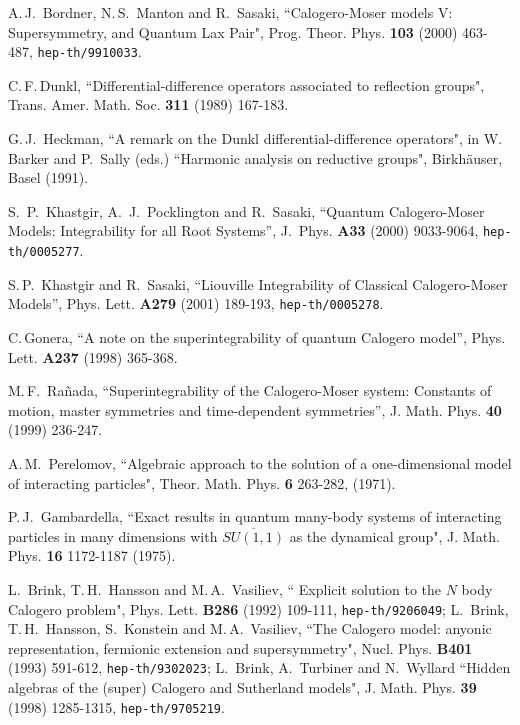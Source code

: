 \documentclass[a4paper,12pt]{article}
\begin{document}
\begin{thebibliography}{99}
  A.\,J.\, Bordner, N.\,S.\, Manton and R.\, Sasaki,
``Calogero-Moser models V:  Supersymmetry,
and Quantum Lax Pair", Prog. Theor. Phys. {\bf 103} (2000) 463-487,
{\tt hep-th/9910033}.

C.\,F.\,Dunkl, ``Differential-difference operators associated to
reflection groups", Trans. Amer. Math. Soc. {\bf 311} (1989) 167-183.

G.\,J.\, Heckman, ``A remark on the Dunkl differential-difference
operators", in W.\, Barker and P.\, Sally (eds.) ``Harmonic analysis
on reductive groups", Birkh\"auser, Basel (1991).

S.\, P.\, Khastgir, A.\, J.\, Pocklington and R.\, Sasaki,
``Quantum Calogero-Moser Models: Integrability for all Root Systems'',
J.\ Phys. {\bf A33} (2000) 9033-9064,
{\tt hep-th/0005277}.



S.\,P.\, Khastgir and R.\, Sasaki,
``Liouville Integrability of Classical Calogero-Moser Models'',
Phys. Lett. {\bf A279} (2001) 189-193,
{\tt hep-th/0005278}.

C.\,Gonera,
``A note on the superintegrability of quantum Calogero model'',
 Phys. Lett. {\bf A237} (1998) 365-368.


M.\,F.\, Ra\~{n}ada,
``Superintegrability of the Calogero-Moser system:
Constants of motion, master symmetries and time-dependent symmetries'',
J. Math. Phys. {\bf 40} (1999) 236-247.


A.\,M.\, Perelomov, ``Algebraic approach to the solution of a
one-dimensional model of interacting particles",
Theor. Math. Phys. {\bf 6} 263-282, (1971).

P.\,J.\, Gambardella, ``Exact results in quantum many-body systems of
interacting particles in many dimensions with \(\overline{SU(1,1)}\) as the
dynamical group",
J. Math. Phys. {\bf 16} 1172-1187 (1975).

L.\, Brink, T.\,H.\, Hansson and M.\,A.\, Vasiliev, `` Explicit solution
to
the \(N\) body Calogero problem", Phys. Lett. {\bf B286} (1992) 109-111,
{\tt hep-th/9206049};
L.\, Brink, T.\,H.\, Hansson, S.\, Konstein and M.\,A.\, Vasiliev,
``The Calogero model: anyonic representation, fermionic extension and
supersymmetry", Nucl. Phys. {\bf B401} (1993) 591-612,
{\tt hep-th/9302023};
L.\, Brink, A.\, Turbiner and N.\, Wyllard ``Hidden algebras of the
(super) Calogero and Sutherland models", J. Math. Phys. {\bf 39} (1998)
1285-1315,  {\tt hep-th/9705219}.



\end{thebibliography}
\end{document}
